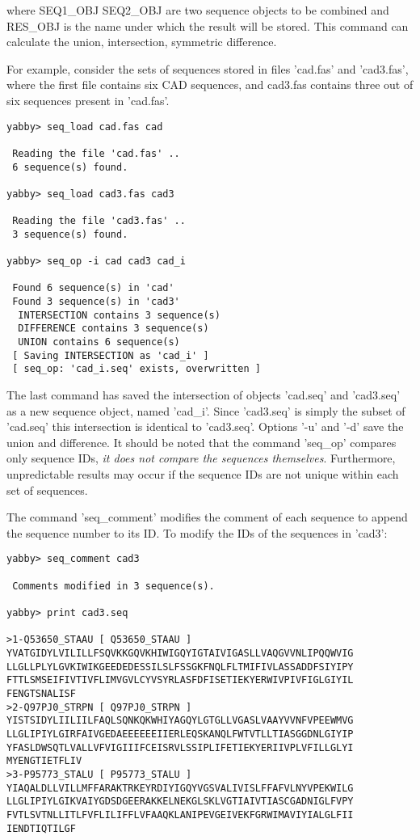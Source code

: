 where SEQ1\_OBJ SEQ2\_OBJ are two sequence objects to be combined 
and RES\_OBJ is the name under which the result will be stored.
This command can calculate the union, intersection, symmetric
difference.

For example, consider the sets of sequences stored in files
'cad.fas' and 'cad3.fas', where the first file contains six 
CAD sequences, and cad3.fas contains three out of six sequences
present in 'cad.fas'.

\begin{verbatim}
yabby> seq_load cad.fas cad

 Reading the file 'cad.fas' ..
 6 sequence(s) found.

yabby> seq_load cad3.fas cad3

 Reading the file 'cad3.fas' ..
 3 sequence(s) found.

yabby> seq_op -i cad cad3 cad_i

 Found 6 sequence(s) in 'cad'
 Found 3 sequence(s) in 'cad3'
  INTERSECTION contains 3 sequence(s)
  DIFFERENCE contains 3 sequence(s)
  UNION contains 6 sequence(s)
 [ Saving INTERSECTION as 'cad_i' ]
 [ seq_op: 'cad_i.seq' exists, overwritten ]
\end{verbatim}

The last command has saved the intersection of objects 'cad.seq' and
'cad3.seq' as a new sequence object, named 'cad\_i'. Since 'cad3.seq'
is simply the subset of 'cad.seq' this intersection is identical to
'cad3.seq'. Options '-u' and '-d' save the union and difference.
It should be noted that the command 'seq\_op' compares only
sequence IDs, {\em it does not compare the sequences themselves}.
Furthermore, unpredictable results may occur if the sequence IDs
are not unique within each set of sequences. 


The command 'seq\_comment' modifies the comment of each sequence
to append the sequence number to its ID. To modify the IDs of the
sequences in 'cad3':

\begin{verbatim}
yabby> seq_comment cad3

 Comments modified in 3 sequence(s).

yabby> print cad3.seq

>1-Q53650_STAAU [ Q53650_STAAU ]
YVATGIDYLVILILLFSQVKKGQVKHIWIGQYIGTAIVIGASLLVAQGVVNLIPQQWVIG
LLGLLPLYLGVKIWIKGEEDEDESSILSLFSSGKFNQLFLTMIFIVLASSADDFSIYIPY
FTTLSMSEIFIVTIVFLIMVGVLCYVSYRLASFDFISETIEKYERWIVPIVFIGLGIYIL
FENGTSNALISF
>2-Q97PJ0_STRPN [ Q97PJ0_STRPN ]
YISTSIDYLIILIILFAQLSQNKQKWHIYAGQYLGTGLLVGASLVAAYVVNFVPEEWMVG
LLGLIPIYLGIRFAIVGEDAEEEEEEIIERLEQSKANQLFWTVTLLTIASGGDNLGIYIP
YFASLDWSQTLVALLVFVIGIIIFCEISRVLSSIPLIFETIEKYERIIVPLVFILLGLYI
MYENGTIETFLIV
>3-P95773_STALU [ P95773_STALU ]
YIAQALDLLVILLMFFARAKTRKEYRDIYIGQYVGSVALIVISLFFAFVLNYVPEKWILG
LLGLIPIYLGIKVAIYGDSDGEERAKKELNEKGLSKLVGTIAIVTIASCGADNIGLFVPY
FVTLSVTNLLITLFVFLILIFFLVFAAQKLANIPEVGEIVEKFGRWIMAVIYIALGLFII
IENDTIQTILGF
\end{verbatim}

